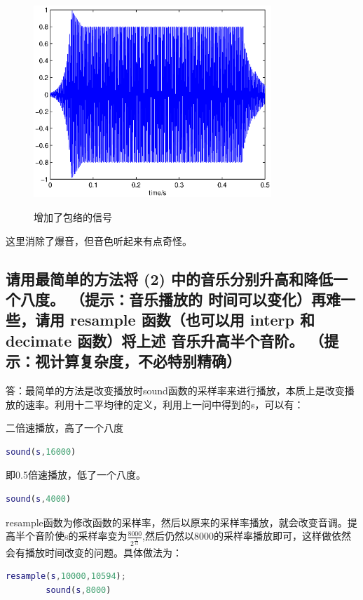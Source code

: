 \documentclass{ctexart}
\begin{document}
        \begin{figure}
            \centering
            \includegraphics[width=0.8\textwidth]{dfh/1_1.eps}\\
            \caption{增加了包络的信号\label{11}}
        \end{figure}

        
        这里消除了爆音，但音色听起来有点奇怪。
    \subsection{
            请用最简单的方法将 (2) 中的音乐分别升高和降低一个八度。 （提示：音乐播放的
            时间可以变化）再难一些，请用 resample 函数（也可以用 interp 和 decimate 函数）将上述
            音乐升高半个音阶。 （提示：视计算复杂度，不必特别精确）
        }

        答：最简单的方法是改变播放时sound函数的采样率来进行播放，本质上是改变播放的速率。利用十二平均律的定义，利用上一问中得到的s，可以有：

        二倍速播放，高了一个八度
        \begin{lstlisting}[language=matlab]
        sound(s,16000)
        \end{lstlisting}
        即0.5倍速播放，低了一个八度。
        \begin{lstlisting}[language=matlab]
        sound(s,4000)
        \end{lstlisting}
        resample函数为修改函数的采样率，然后以原来的采样率播放，就会改变音调。提高半个音阶使s的采样率变为$\frac{8000}{2^{\frac{1}{12}}}$,然后仍然以8000的采样率播放即可，这样做依然会有播放时间改变的问题。具体做法为：

        \begin{lstlisting}[language=matlab]
        resample(s,10000,10594);
        sound(s,8000)
        \end{lstlisting}
\end{document}
